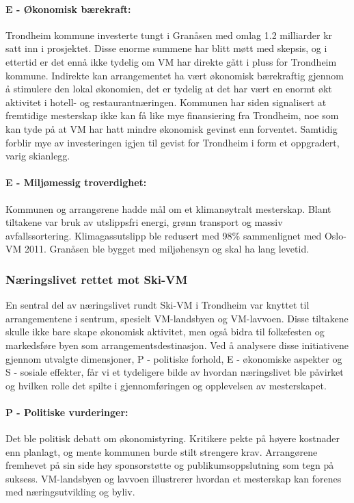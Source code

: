\paragraph{E - Økonomisk bærekraft:} Trondheim kommune investerte tungt i Granåsen med omlag 1.2 
milliarder kr satt inn i prosjektet\cite{NRK12Milliarder}. Disse enorme summene har blitt møtt med skepsis,
og i ettertid er det ennå ikke tydelig om VM har direkte gått i pluss for Trondheim kommune\cite{AftenpostenNyVM}.
Indirekte kan arrangementet ha vært økonomisk bærekraftig gjennom å stimulere den lokal
økonomien, det er tydelig at det har vært en enormt økt aktivitet i hotell- og
restaurantnæringen\cite{DagbladetPriser}. Kommunen har siden signalisert at fremtidige mesterskap ikke
kan få like mye finansiering fra Trondheim\cite{NeaRadioVM}, noe som kan tyde på at VM har hatt mindre økonomisk
gevinst enn forventet. Samtidig forblir mye av investeringen igjen til gevist for Trondheim i form
et oppgradert, varig skianlegg.

\paragraph{E - Miljømessig troverdighet:} Kommunen og arrangørene hadde mål om et klimanøytralt 
mesterskap\cite{TrondheimKommuneVM}. Blant tiltakene var bruk av utslippsfri energi, grønn 
transport og massiv avfallssortering. Klimagassutslipp ble redusert med 98\% sammenlignet 
med Oslo-VM 2011\cite{Trondheim2025Kutt}. Granåsen ble bygget med miljøhensyn og skal ha lang levetid. 


\subsubsection{Næringslivet rettet mot Ski-VM}
En sentral del av næringslivet rundt Ski-VM i Trondheim var knyttet til arrangementene i sentrum, 
spesielt VM-landsbyen og VM-lavvoen. Disse tiltakene skulle ikke bare skape økonomisk aktivitet, 
men også bidra til folkefesten og markedsføre byen som arrangementsdestinasjon. Ved å analysere 
disse initiativene gjennom utvalgte dimensjoner, P - politiske forhold, E - økonomiske aspekter og 
S - sosiale effekter, får vi et tydeligere bilde av hvordan næringslivet ble påvirket og hvilken 
rolle det spilte i gjennomføringen og opplevelsen av mesterskapet.

\paragraph{P - Politiske vurderinger:}
Det ble politisk debatt om økonomistyring. Kritikere pekte på høyere kostnader enn planlagt, 
og mente kommunen burde stilt strengere krav\parencite{nettavisenKritikk}. Arrangørene fremhevet på sin side høy sponsorstøtte og 
publikumsoppslutning som tegn på suksess\parencite{kom24Sponsorsalg}. VM-landsbyen og lavvoen illustrerer hvordan 
et mesterskap kan forenes med næringsutvikling og byliv.


